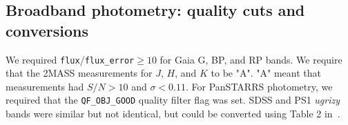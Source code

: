 \documentclass{aa}
\begin{document}
\begin{appendix}
\section{Broadband photometry: quality cuts and conversions}
\label{sec:app:photometry}
We required \texttt{flux}/\texttt{flux\_error}$ \geq 10$ for Gaia G, BP, and RP bands. We require that the 2MASS measurements for $J$, $H$, and $K$ to be "A". "A" meant that measurements had $S/N>10$ and $\sigma<0.11$. For PanSTARRS photometry, we required that the \texttt{QF\_OBJ\_GOOD} quality filter flag was set. %
SDSS and PS1 \textit{ugrizy} bands were similar but not identical, but could be converted using Table 2 in~\citet{finkbeiner_ps1tosdss_2016}.

\end{appendix}
\end{document}
